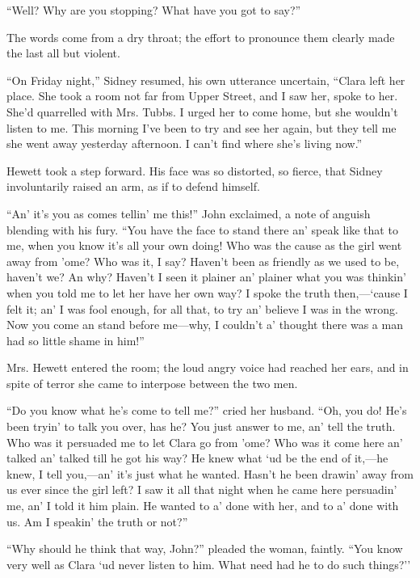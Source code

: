 {\protect\hypertarget{284}{}{}}``Well? Why are you stopping? What have
you got to say?''

The words come from a dry throat; the effort to pronounce them clearly
made the last all but violent.

``On Friday night,'' Sidney resumed, his own utterance uncertain,
``Clara left her place. She took a room not far from Upper Street, and I
saw her, spoke to her. She'd quarrelled with Mrs. Tubbs. I urged her to
come home, but she wouldn't listen to me. This morning I've been to try
and see her again, but they tell me she went away yesterday afternoon. I
can't find where she's living now.''

Hewett took a step forward. His face was so distorted, so fierce, that
Sidney involuntarily raised an arm, as if to defend himself.

``An' it's you as comes tellin' me this!'' John exclaimed, a note of
anguish blending with his fury. ``You have the face to stand there an'
speak like that to me, when you know it's all your own doing! Who was
the cause as the girl went away from 'ome? Who was it, I say? Haven't
been as friendly as we {\protect\hypertarget{285}{}{}}used to be,
haven't we? An why? Haven't I seen it plainer an' plainer what you was
thinkin' when you told me to let her have her own way? I spoke the truth
then,---`cause I felt it; an' I was fool enough, for all that, to try
an' believe I was in the wrong. Now you come an stand before me---why, I
couldn't a' thought there was a man had so little shame in him!''

Mrs. Hewett entered the room; the loud angry voice had reached her ears,
and in spite of terror she came to interpose between the two men.

``Do you know what he's come to tell me?'' cried her husband. ``Oh, you
do! He's been tryin' to talk you over, has he? You just answer to me,
an' tell the truth. Who was it persuaded me to let Clara go from 'ome?
Who was it come here an' talked an' talked till he got his way? He knew
what `ud be the end of it,---he knew, I tell you,---an' it's just what
he wanted. Hasn't he been drawin' away from us ever since the girl left?
I saw it all that night when he came here persuadin'
{\protect\hypertarget{286}{}{}}me, an' I told it him plain. He wanted to
a' done with her, and to a' done with us. Am I speakin' the truth or
not?''

``Why should he think that way, John?'' pleaded the woman, faintly.
``You know very well as Clara `ud never listen to him. What need had he
to do such things?''

